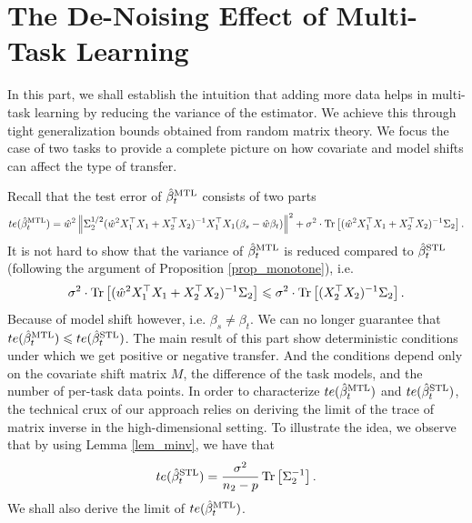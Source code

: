 \section{The De-Noising Effect of Multi-Task Learning}


In this part, we shall establish the intuition that adding more data helps in multi-task learning by reducing the variance of the estimator.
We achieve this through tight generalization bounds obtained from random matrix theory.
We focus the case of two tasks to provide a complete picture on how covariate and model shifts can affect the type of transfer.

Recall that the test error of $\hat{\beta}_{t}^{\text{MTL}}$ consists of two parts
\begin{align}
	te(\hat{\beta}_t^{\text{MTL}}) = \hat{w}^2 \left\| \Sigma_2^{1/2} (\hat{w}^2 X_1^{\top}X_1 + X_2^{\top}X_2)^{-1}X_1^{\top}X_1 (\beta_s - \hat{w}\beta_t) \right\|^2 + \sigma^2\cdot \operatorname{Tr}\left[(\hat{w}^2 X_1^{\top}X_1 + X_2^{\top}X_2)^{-1}\Sigma_2\right]. \label{eq_te_model_shift}
\end{align}
It is not hard to show that the variance of $\hat{\beta}_t^{\text{MTL}}$ is reduced compared to $\hat{\beta}_t^{\text{STL}}$ (following the argument of Proposition \ref{prop_monotone}), i.e.
\[ \sigma^2\cdot \operatorname{Tr}\left[(\hat{w}^2 X_1^{\top}X_1 + X_2^{\top}X_2)^{-1}\Sigma_2\right] \leqslant \sigma^2\cdot \operatorname{Tr}\left[(X_2^{\top}X_2)^{-1}\Sigma_2\right]. \]
Because of model shift however, i.e. $\beta_s \neq \beta_t$.
We can no longer guarantee that $te(\hat{\beta}_{t}^{\text{MTL}}) \leqslant te(\hat{\beta}_t^{\text{STL}})$.
The main result of this part show deterministic conditions under which we get positive or negative transfer.
And the conditions depend only on the covariate shift matrix $M$, the difference of the task models, and the number of per-task data points.
In order to characterize $te(\hat{\beta}_t^{\text{MTL}})$ and $te(\hat{\beta}_t^{\text{STL}})$, the technical crux of our approach relies on deriving the limit of the trace of matrix inverse in the high-dimensional setting.
To illustrate the idea, we observe that by using Lemma \ref{lem_minv}, we have that
\[ te(\hat{\beta}_t^{\text{STL}}) = \frac{\sigma^2}{n_2 - p}\operatorname{Tr}\left[\Sigma_2^{-1}\right]. \]
We shall also derive the limit of $te(\hat{\beta}_t^{\text{MTL}})$.


